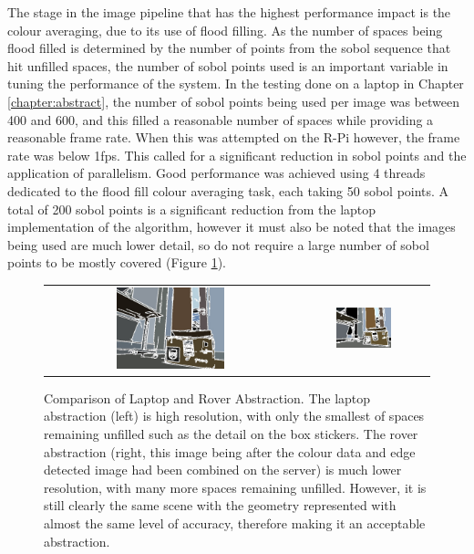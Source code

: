 The stage in the image pipeline that has the highest performance impact is the colour averaging, due to its use of flood filling. As the number of spaces being flood filled is determined by the number of points from the sobol sequence that hit unfilled spaces, the number of sobol points used is an important variable in tuning the performance of the system. In the testing done on a laptop in Chapter \ref{chapter:abstract}, the number of sobol points being used per image was between 400 and 600, and this filled a reasonable number of spaces while providing a reasonable frame rate. When this was attempted on the R-Pi however, the frame rate was below 1fps. This called for a significant reduction in sobol points and the application of parallelism. Good performance was achieved using 4 threads dedicated to the flood fill colour averaging task, each taking 50 sobol points. A total of 200 sobol points is a significant reduction from the laptop implementation of the algorithm, however it must also be noted that the images being used are much lower detail, so do not require a large number of sobol points to be mostly covered (Figure \ref{fig:LvsR}). 

\begin{figure}[H]
    \begin{center}
    \begin{tabular}{ c c }
        \includegraphics[width=0.45\textwidth]{Figures/abstractcompL.jpg} &
        \includegraphics[width=0.45\textwidth]{Figures/abstractcompR.jpg}
    \end{tabular}
    \caption[Comparison of Laptop and Rover Abstraction]{Comparison of Laptop and Rover Abstraction. The laptop abstraction (left) is high resolution, with only the smallest of spaces remaining unfilled such as the detail on the box stickers. The rover abstraction (right, this image being after the colour data and edge detected image had been combined on the server) is much lower resolution, with many more spaces remaining unfilled. However, it is still clearly the same scene with the geometry represented with almost the same level of accuracy, therefore making it an acceptable abstraction.}
    \label{fig:LvsR}
    \end{center}
\end{figure}


